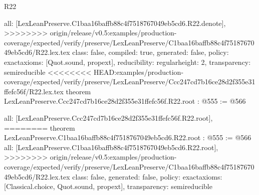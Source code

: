 \begin{lexlean}{R22}
\begin{coremodule}
{{{{{  all: [LexLeanPreserve.C1baa16baffb88c4f7518767049eb5cd6.R22.denote],
>>>>>>>> origin/release/v0.5:examples/production-coverage/expected/verify/preserve/LexLeanPreserve/C1baa16baffb88c4f7518767049eb5cd6/R22.lex.tex
  class: false,
  compiled: true,
  generated: false,
  policy: exact{axioms: [Quot.sound, propext]},
  reducibility: regular{height: 2},
  transparency: semireducible
}
<<<<<<<< HEAD:examples/production-coverage/expected/verify/preserve/LexLeanPreserve/Ccc247cd7b16ce28d2f355e31ffefc56f/R22.lex.tex
theorem LexLeanPreserve.Ccc247cd7b16ce28d2f355e31ffefc56f.R22.root : @555 := @566 {
  all: [LexLeanPreserve.Ccc247cd7b16ce28d2f355e31ffefc56f.R22.root],
========
theorem LexLeanPreserve.C1baa16baffb88c4f7518767049eb5cd6.R22.root : @555 := @566 {
  all: [LexLeanPreserve.C1baa16baffb88c4f7518767049eb5cd6.R22.root],
>>>>>>>> origin/release/v0.5:examples/production-coverage/expected/verify/preserve/LexLeanPreserve/C1baa16baffb88c4f7518767049eb5cd6/R22.lex.tex
  class: false,
  generated: false,
  policy: exact{axioms: [Classical.choice, Quot.sound, propext]},
  transparency: semireducible
}

}}}}}
\end{coremodule}
\end{lexlean}
